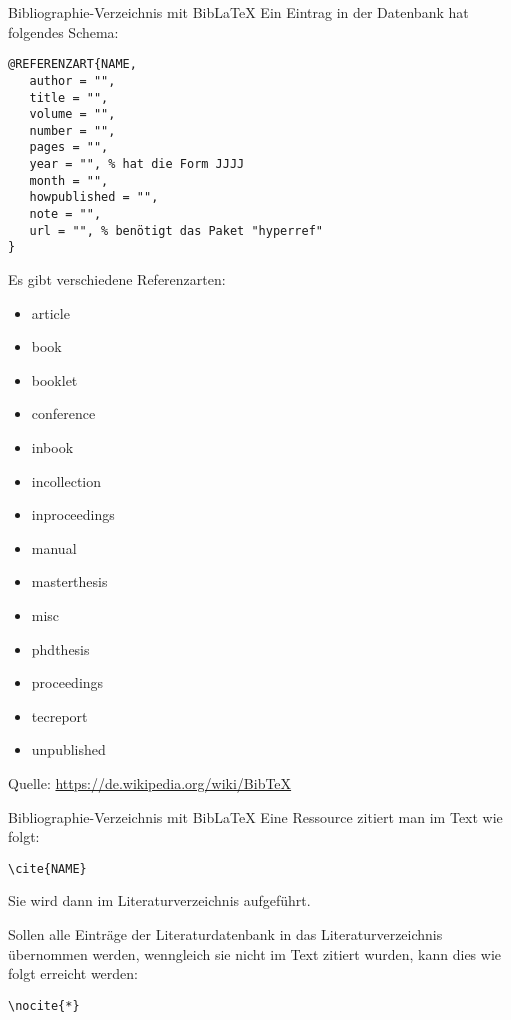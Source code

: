 \begin{frame}[fragile]{Bibliographie-Verzeichnis mit Bib\LaTeX}
Ein Eintrag in der Datenbank hat folgendes Schema:
\begin{lstlisting}[style=tex]
@REFERENZART{NAME,
   author = "",
   title = "",
   volume = "",
   number = "",
   pages = "",
   year = "", % hat die Form JJJJ
   month = "",
   howpublished = "",
   note = "",
   url = "", % benötigt das Paket "hyperref"
}
\end{lstlisting}

Es gibt verschiedene Referenzarten:
\begin{small}
\vspace{-1ex}
\begin{multicols}{3}
\begin{itemize}\setlength{\itemsep}{-0.5ex}
\item article
\item book
\item booklet
\item conference
\item inbook
\item incollection
\item inproceedings
\item manual
\item masterthesis
\item misc
\item phdthesis
\item proceedings
\item tecreport
\item unpublished
\end{itemize}
\end{multicols}
\end{small}

Quelle: \url{https://de.wikipedia.org/wiki/BibTeX}
\end{frame}

\begin{frame}[fragile]{Bibliographie-Verzeichnis mit Bib\LaTeX}
Eine Ressource zitiert man im Text wie folgt:
\begin{lstlisting}[style=tex]
\cite{NAME}
\end{lstlisting}
Sie wird dann im Literaturverzeichnis aufgeführt.%

\bigskip
Sollen alle Einträge der Literaturdatenbank in das Literaturverzeichnis übernommen
werden, wenngleich sie nicht im Text zitiert wurden, kann dies wie folgt erreicht werden:
\begin{lstlisting}[style=tex]
\nocite{*}
\end{lstlisting}
\end{frame}